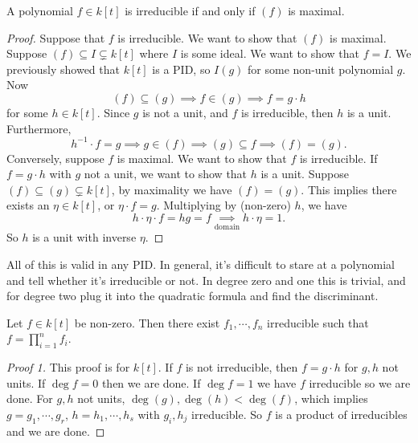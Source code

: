 \begin{lemma}
    A polynomial $f \in k[t]$ is irreducible if and only if $(f)$ is maximal.
\end{lemma}
\begin{proof}
Suppose that $f$ is irreducible. We want to show that $(f)$ is maximal. Suppose $(f) \subseteq I \subsetneq k[t] $ where $I$ is some ideal. We want to show that $f=I$. We previously showed that $k[t]$ is a PID, so $I(g) $ for some non-unit polynomial $g$. Now \[
    (f) \subseteq (g) \implies  f \in (g) \implies f=g \cdot h
\] for some $h \in k[t]$. Since $g $ is not a unit, and $f$ is irreducible, then $h$ is a unit. Furthermore, \[
h ^{-1} \cdot  f =g \implies  g \in (f) \implies  (g) \subseteq  f \implies (f) =(g).
\] Conversely, suppose $f$ is maximal. We want to show that $f$ is irreducible. If $f=g\cdot h$ with $g$ not a unit, we want to show that $h$ is a unit. Suppose $(f ) \subseteq (g) \subsetneq k[t]$, by maximality we have $(f)=(g)$. This implies there exists an $\eta \in k[t]$, or $\eta \cdot  f=g$. Multiplying by (non-zero) $h$, we have \[
h \cdot \eta \cdot f=hg =f \underset{\text{domain} }{  \implies } h \cdot \eta=1.
\] So $h$ is a unit with inverse $\eta$.
\end{proof}
\begin{remark}
    All of this is valid in any PID. In general, it's difficult to stare at a polynomial and tell whether it's irreducible or not. In degree zero and one this is trivial, and for degree two plug it into the quadratic formula and find the discriminant.
\end{remark}
\begin{lemma}
    Let $f \in k[t]$ be non-zero. Then there exist $f_1, \cdots ,f_n $ irreducible such that $f=\prod _{i=1}^n f _i $.
\end{lemma}
\begin{proof}[Proof 1]
    This proof is for $k[t]$. If $f$ is not irreducible, then $f=g\cdot h$ for $g, h $ not units. If $\deg f=0$ then we are done. If $\deg f=1$ we have $f$ irreducible so we are done. For $g,h$ not units, $\deg(g) , \deg(h) < \deg(f)$, which implies $g=g_1, \cdots ,g_r$, $h=h_1, \cdots ,h_s$ with $g_i, h_j $ irreducible. So $f$ is a product of irreducibles and we are done. 
\end{proof}
